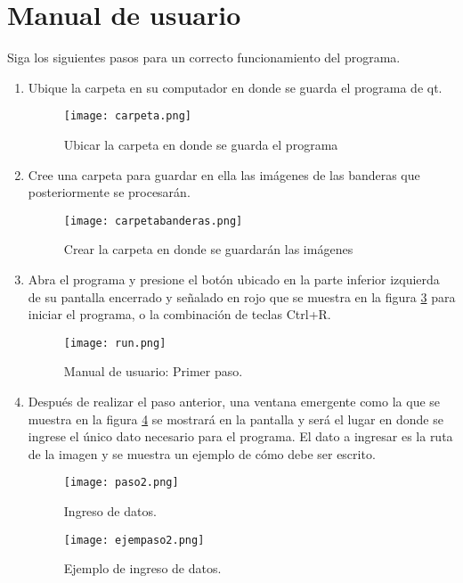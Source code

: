 \documentclass{article}
\begin{document}
\section{Manual de usuario} \label{manual}
Siga los siguientes pasos para un correcto funcionamiento del programa.
\begin{enumerate}
    \item Ubique la carpeta en su computador en donde se guarda el programa de qt.
    
\begin{figure}[h]
\texttt{[image: carpeta.png]}
\centering
\caption{Ubicar la carpeta en donde se guarda el programa}
\label{fig:carpeta}
\end{figure}

\newpage

    \item Cree una carpeta para guardar en ella las imágenes de las banderas que posteriormente se procesarán.
\begin{figure}[h]
\texttt{[image: carpetabanderas.png]}
\centering
\caption{Crear la carpeta en donde se guardarán las imágenes}
\label{fig:carpetabanderas}
\end{figure}
    
    \item Abra el programa y presione el botón ubicado en la parte inferior izquierda de su pantalla encerrado y señalado en rojo que se muestra en la figura \ref{fig:run} para iniciar el programa, o la combinación de teclas Ctrl+R.

\begin{figure}[h]
\texttt{[image: run.png]}
\centering
\caption{Manual de usuario: Primer paso.}
\label{fig:run}
\end{figure}

\newpage
    \item Después de realizar el paso anterior, una ventana emergente como la que se muestra en la figura \ref{fig:paso2} se mostrará en la pantalla y será el lugar en donde se ingrese el único dato necesario para el programa. 
    El dato a ingresar es la ruta de la imagen y se muestra un ejemplo de cómo debe ser escrito.
    
\begin{figure}[h]
\texttt{[image: paso2.png]}
\centering
\caption{Ingreso de datos.}
\label{fig:paso2}
\end{figure}

\begin{figure}[h]
\texttt{[image: ejempaso2.png]}
\centering
\caption{Ejemplo de ingreso de datos.}
\label{fig:ejempaso2}
\end{figure}


\end{enumerate}
\end{document}
